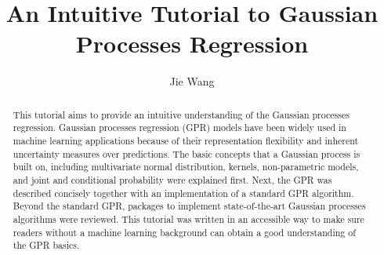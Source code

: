 \documentclass[preprint,12pt]{elsarticle}
\begin{document}
\begin{frontmatter}



\title{An Intuitive Tutorial to Gaussian Processes Regression}


\author[label1]{Jie Wang }


\begin{abstract}
This tutorial aims to provide an intuitive understanding of the Gaussian processes regression. Gaussian processes regression (GPR) models have been widely used in machine learning applications because of their representation flexibility and inherent uncertainty measures over predictions. The basic concepts that a Gaussian process is built on, including multivariate normal distribution, kernels, non-parametric models, and joint and conditional probability were explained first. Next, the GPR was described concisely together with an implementation of a standard GPR algorithm. Beyond the standard GPR, packages to implement state-of-the-art Gaussian processes algorithms were reviewed. This tutorial was written in an accessible way to make sure readers without a machine learning background can obtain a good understanding of the GPR basics. 
\end{abstract}


\end{frontmatter}
\end{document}
